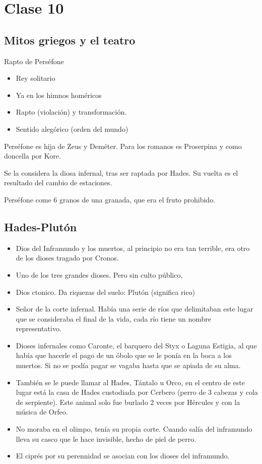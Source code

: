 \chapter{Clase 10}\label{ch:clase10}
\section{Mitos griegos y el teatro}
Rapto de Perséfone
\begin{itemize}
	\item Rey solitario
	\item Ya en los himnos homéricos
	\item Rapto (violación) y transformación.
	\item Sentido alegórico (orden del mundo)
\end{itemize}

Perséfone es hija de Zeus y Deméter. Para los romanos es Proserpina y como doncella por Kore.

Se la considera la diosa infernal, tras ser raptada por Hades. Su vuelta es el resultado del cambio de estaciones.

Perséfone come 6 granos de una granada, que era el fruto prohibido.

\section{Hades-Plutón}
\begin{itemize}
	\item Dios del Inframundo y los muertos, al principio no era tan terrible, era otro de los dioses tragado por Cronos.
	\item Uno de los tres grandes dioses. Pero sin culto público,
	\item Dios ctonico. Da riquezas del suelo: Plutón (significa rico)
	\item Señor de la corte infernal. Había una serie de ríos que delimitaban este lugar que se consideraba el final de la vida, cada río tiene un nombre representativo.
	\item Dioses infernales como Caronte, el barquero del Styx o Laguna Estigia, al que había que hacerle el pago de un óbolo que se le ponía en la boca a los muertos. Si no se podía pagar se vagaba hasta que se apiada de su alma.
	\item También se le puede llamar al Hades, Tántalo u Orco, en el centro de este lugar está la casa de Hades custodiada por Cerbero (perro de 3 cabezas y cola de serpiente). Este animal solo fue burlado 2 veces por Hércules y con la música de Orfeo.
	\item No moraba en el olimpo, tenía su propia corte. Cuando salía del inframundo lleva su casco que le hace invisible, hecho de piel de perro.
	\item El ciprés por su perennidad se asocian con los dioses del inframundo.
\end{itemize}

